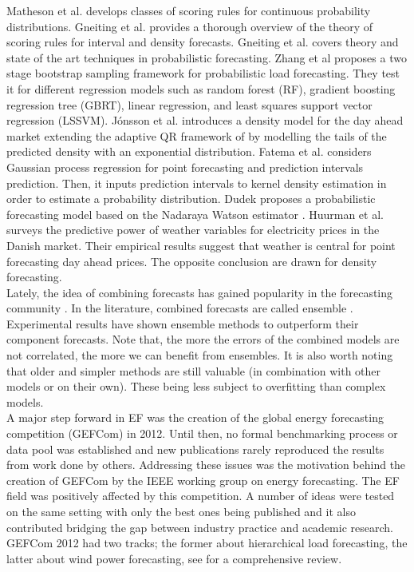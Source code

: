 Matheson et al. \cite{matheson1976scoring} develops classes of scoring rules for continuous probability distributions.
Gneiting et al. \cite{gneiting2007strictly}
provides a thorough overview of the theory of scoring rules for interval and density forecasts.
Gneiting et al. \cite{gneiting2014probabilistic}
covers theory and state of the art techniques in probabilistic forecasting.
Zhang et al \cite{zhang2020two} proposes a two stage bootstrap sampling framework for probabilistic load forecasting. They test it for different regression models such as random forest (RF), gradient boosting regression tree (GBRT), linear regression, and least squares support vector regression (LSSVM).
Jónsson et al. \cite{jonsson2014predictive}
introduces a density model for the day ahead market extending the adaptive QR framework of \cite{moller2008time} by modelling the tails of the predicted density with an exponential distribution.
Fatema et al. \cite{fatema2023probabilistic} considers Gaussian process regression for point forecasting and prediction intervals prediction. Then, it inputs prediction intervals to kernel density estimation in order to estimate a probability distribution.
Dudek \cite{dudek2018probabilistic} proposes a probabilistic forecasting model based on the Nadaraya Watson estimator \cite{nadaraya1964estimating,watson1964smooth}.
Huurman et al. \cite{huurman2012power} surveys the predictive power of weather variables for electricity prices in the Danish market. Their empirical results suggest that weather is central for point forecasting day ahead prices. The opposite conclusion are drawn for density forecasting.
\\
Lately, the idea of combining forecasts has gained popularity in the forecasting community \cite{forecasting_big}. In the literature, combined forecasts are called ensemble \cite{gneiting_weather_ensemble}.
Experimental results have shown ensemble methods to outperform their component forecasts.
Note that, the more the errors of the combined models are not correlated, the more we can benefit from ensembles.
It is also worth noting that older and simpler methods are still valuable (in combination with other models or on their own). These being less subject to overfitting than complex models.
\\
A major step forward in EF was the creation of the global energy forecasting competition (GEFCom) in 2012. Until then, no formal benchmarking process or data pool was established and new publications rarely reproduced the results from work done by others. Addressing these issues was the motivation behind the creation of GEFCom by the IEEE working group on energy forecasting. The EF field was positively affected by this competition. A number of ideas were tested on the same setting with only the best ones being published and it also contributed bridging the gap between industry practice and academic research. GEFCom 2012 had two tracks; the former about hierarchical load forecasting, the latter about wind power forecasting, see \cite{hong2014global} for a comprehensive review. 
